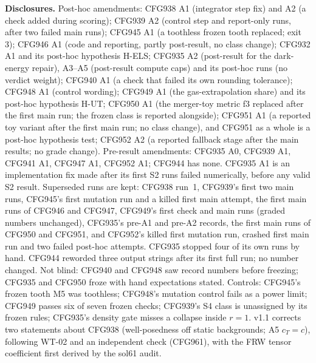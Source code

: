 \documentclass[10pt]{article}
\begin{document}
\textbf{Disclosures.} Post-hoc amendments: CFG938 A1 (integrator step fix) and A2 (a check added during scoring); CFG939 A2 (control step and report-only runs, after two failed main runs); CFG945 A1 (a toothless frozen tooth replaced; exit 3); CFG946 A1 (code and reporting, partly post-result, no class change); CFG932 A1 and its post-hoc hypothesis H-ELS; CFG935 A2 (post-result for the dark-energy repair), A3--A5 (post-result compute caps) and its post-hoc runs (no verdict weight); CFG940 A1 (a check that failed its own rounding tolerance); CFG948 A1 (control wording); CFG949 A1 (the gas-extrapolation share) and its post-hoc hypothesis H-UT; CFG950 A1 (the merger-toy metric f3 replaced after the first main run; the frozen class is reported alongside); CFG951 A1 (a reported toy variant after the first main run; no class change), and CFG951 as a whole is a post-hoc hypothesis test; CFG952 A2 (a reported fallback stage after the main results; no grade change). Pre-result amendments: CFG935 A0, CFG939 A1, CFG941 A1, CFG947 A1, CFG952 A1; CFG944 has none. CFG935 A1 is an implementation fix made after its first S2 runs failed numerically, before any valid S2 result. Superseded runs are kept: CFG938 run~1, CFG939's first two main runs, CFG945's first mutation run and a killed first main attempt, the first main runs of CFG946 and CFG947, CFG949's first check and main runs (graded numbers unchanged), CFG935's pre-A1 and pre-A2 records, the first main runs of CFG950 and CFG951, and CFG952's killed first mutation run, crashed first main run and two failed post-hoc attempts. CFG935 stopped four of its own runs by hand. CFG944 reworded three output strings after its first full run; no number changed. Not blind: CFG940 and CFG948 saw record numbers before freezing; CFG935 and CFG950 froze with hand expectations stated. Controls: CFG945's frozen tooth M5 was toothless; CFG948's mutation control fails as a power limit; CFG949 passes six of seven frozen checks; CFG939's S4 class is unassigned by its frozen rules; CFG935's density gate misses a collapse inside $r=1$. v1.1 corrects two statements about CFG938 (well-posedness off static backgrounds; A5 $c_T=c$), following WT-02 and an independent check (CFG961), with the FRW tensor coefficient first derived by the sol61 audit.
\end{document}

